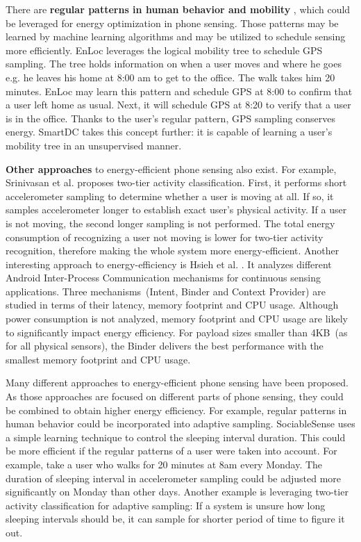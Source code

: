 There are \textbf{regular patterns in human behavior and mobility} \cite{falaki:diversity} \cite{banerjee:batteries}, which could be leveraged for energy optimization in phone sensing. Those patterns may be learned by machine learning algorithms and may be utilized to schedule sensing more efficiently. EnLoc \cite{constandache:enloc} leverages the logical mobility tree to schedule GPS sampling. The tree holds information on when a user moves and where he goes e.g. he leaves his home at 8:00 am to get to the office. The walk takes him 20 minutes. EnLoc may learn this pattern and schedule GPS at 8:00 to confirm that a user left home as usual. Next, it will schedule GPS at 8:20 to verify that a user is in the office. Thanks to the user's regular pattern, GPS sampling conserves energy. SmartDC \cite{chon:smartdc} takes this concept further: it is capable of learning a user's mobility tree in an unsupervised manner.

\textbf{Other approaches} to energy-efficient phone sensing also exist. For example, Srinivasan et al. \cite{srinivasan:twotier} proposes two-tier activity classification. First, it performs short accelerometer sampling to determine whether a user is moving at all. If so, it samples accelerometer longer to establish exact user's physical activity. If a user is not moving, the second longer sampling is not performed. The total energy consumption of recognizing a user not moving is lower for two-tier activity recognition, therefore making the whole system more energy-efficient. Another interesting approach to energy-efficiency is Hsieh et al. \cite{hsieh:ipc}. It analyzes different Android Inter-Process Communication mechanisms for continuous sensing applications. Three mechanisms\ (Intent, Binder and Context Provider) are studied in terms of their latency, memory footprint and CPU usage. Although power consumption is not analyzed, memory footprint and CPU usage are likely to significantly impact energy efficiency. For payload sizes smaller than 4KB\ (as for all physical sensors), the Binder delivers the best performance with the smallest memory footprint and CPU usage.

Many different approaches to energy-efficient phone sensing have been proposed. As those approaches are focused on different parts of phone sensing, they could be combined to obtain higher energy efficiency. For example, regular patterns in human behavior could be incorporated into adaptive sampling. SociableSense \cite{rachuri:socialsense} uses a simple learning technique to control the sleeping interval duration. This could be more efficient if the regular patterns of a user were taken into account. For example, take a user who walks for 20 minutes at 8am every Monday. The duration of sleeping interval in accelerometer sampling could be adjusted more significantly on Monday than other days. Another example is leveraging two-tier activity classification for adaptive sampling: If a system is unsure how long sleeping intervals should be, it can sample for shorter period of time to figure it out. 

